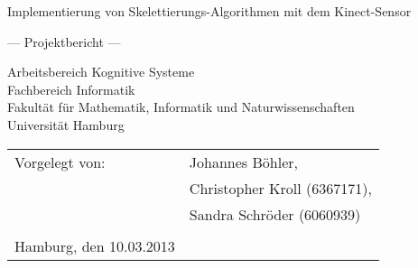 \documentclass[
	12pt,
	a4paper,
	BCOR10mm,
	DIV14,
	listof=totoc,
	bibliography=totoc,
	headsepline
]{scrreprt}
\begin{document}
\begin{titlepage}
	\begin{center}
		{\titlefont\huge Implementierung von Skelettierungs-Algorithmen mit dem Kinect-Sensor\par}

		\bigskip
		\bigskip

		{\titlefont\Large --- Projektbericht ---\par}

		\bigskip
		\bigskip

		{\large Arbeitsbereich Kognitive Systeme\\
		Fachbereich Informatik\\
		Fakultät für Mathematik, Informatik und Naturwissenschaften\\
		Universität Hamburg\par}
	\end{center}
	
	\vfill
	
	{\large \begin{tabular}{ll}
		Vorgelegt von: & Johannes Böhler, \\
				& Christopher Kroll (6367171), \\ 
				& Sandra Schröder (6060939) \\\\
		Hamburg, den 10.03.2013
	  \end{tabular}\par}

\end{titlepage}

\newcommand{\Autor}[1]{{\hfill \Large \textit{Autor: #1}}}




\tableofcontents



%



%




\appendix       %

\end{document}
